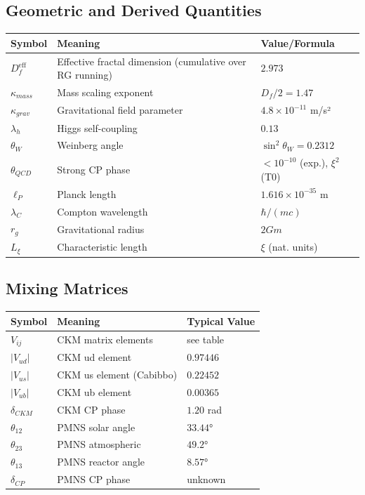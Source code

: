 \subsection{Geometric and Derived Quantities}
\begin{longtable}{lll}
	\toprule
	\textbf{Symbol} & \textbf{Meaning} & \textbf{Value/Formula} \\
	\midrule
	$D_f^{\text{eff}}$ & Effective fractal dimension (cumulative over RG running) & $2.973$ \\
	$\kappa_{mass}$ & Mass scaling exponent & $D_f/2 = 1.47$ \\
	$\kappa_{grav}$ & Gravitational field parameter & $4.8 \times 10^{-11}$ m/s² \\
	$\lambda_h$ & Higgs self-coupling & $0.13$ \\
	$\theta_W$ & Weinberg angle & $\sin^2\theta_W = 0.2312$ \\
	$\theta_{QCD}$ & Strong CP phase & $< 10^{-10}$ (exp.), $\xi^2$ (T0) \\
	$\ell_P$ & Planck length & $1.616 \times 10^{-35}$ m \\
	$\lambda_C$ & Compton wavelength & $\hbar/(mc)$ \\
	$r_g$ & Gravitational radius & $2Gm$ \\
	$L_\xi$ & Characteristic length & $\xi$ (nat. units) \\
	\bottomrule
\end{longtable}
\normalsize

\subsection{Mixing Matrices}
\begin{longtable}{lll}
	\toprule
	\textbf{Symbol} & \textbf{Meaning} & \textbf{Typical Value} \\
	\midrule
	$V_{ij}$ & CKM matrix elements & see table \\
	$|V_{ud}|$ & CKM ud element & $0.97446$ \\
	$|V_{us}|$ & CKM us element (Cabibbo) & $0.22452$ \\
	$|V_{ub}|$ & CKM ub element & $0.00365$ \\
	$\delta_{CKM}$ & CKM CP phase & $1.20$ rad \\
	$\theta_{12}$ & PMNS solar angle & $33.44°$ \\
	$\theta_{23}$ & PMNS atmospheric & $49.2°$ \\
	$\theta_{13}$ & PMNS reactor angle & $8.57°$ \\
	$\delta_{CP}$ & PMNS CP phase & unknown \\
	\bottomrule
\end{longtable}
\normalsize

